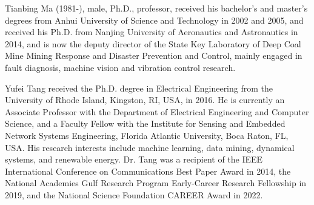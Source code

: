\documentclass[lettersize,journal]{IEEEtran}
\begin{document}
\begin{IEEEbiography}{Tianbing Ma}
(1981-), male, Ph.D., professor, received his bachelor's and master's degrees from Anhui University of Science and Technology in 2002 and 2005, and received his Ph.D. from Nanjing University of Aeronautics and Astronautics in 2014, and is now the deputy director of the State Key Laboratory of Deep Coal Mine Mining Response and Disaster Prevention and Control, mainly engaged in fault diagnosis, machine vision and vibration control research.
\end{IEEEbiography}


\begin{IEEEbiography}{Yufei Tang}
received the Ph.D. degree in Electrical Engineering from the University of Rhode Island, Kingston, RI, USA, in 2016. He is currently an Associate Professor with the Department of Electrical Engineering and Computer Science, and a Faculty Fellow with the Institute for Sensing and Embedded Network Systems Engineering, Florida Atlantic University, Boca Raton, FL, USA. His research interests include machine learning, data mining, dynamical systems, and renewable energy. Dr. Tang was a recipient of the IEEE International Conference on Communications Best Paper Award in 2014, the National Academies Gulf Research Program Early-Career Research Fellowship in 2019, and the National Science Foundation CAREER Award in 2022.
\end{IEEEbiography}
\end{document}
